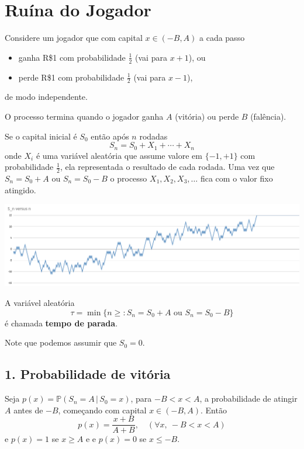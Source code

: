 \documentclass{article}
\begin{document}
\section*{Ruína do Jogador}

Considere um jogador que com capital \( x \in (-B, A) \) a cada passo 
\begin{itemize}
\item ganha R\$1 com probabilidade \( \tfrac{1}{2} \) (vai para \( x+1 \)), ou
\item perde R\$1 com probabilidade \( \tfrac{1}{2} \) (vai para \( x-1 \)),
\end{itemize}
de modo independente.  

O processo termina quando o jogador ganha $A$  (vitória) ou perde $B$ (falência).

Se o capital inicial é $S_0$ então após $n$ rodadas
$$
S_n =S_0 + X_1+\cdots+X_n
$$
onde $X_i$ é uma variável aleatória que assume valore em $\{-1,+1\}$
com probabilidade $\tfrac 12$, ela representada o resultado de cada
rodada. Uma vez que $S_n = S_0+A$ ou $S_n=S_0 -B$ o processo
$X_1,X_2,X_3,\dots$ fica com o valor fixo atingido.

\includegraphics[width=\textwidth]{srw.png}


A variável
aleatória
$$
\tau= \min\{n\geq \colon S_n = S_0+A \text{  ou } S_n=S_0 -B\}
$$
é chamada \textbf{tempo de parada}.

Note que podemos assumir que $S_0=0$.

\subsection*{1. Probabilidade de vitória}

Seja \( p(x) = \mathbb{P} (S_n = A \,|\, S_0=x)\), para $-B<x<A$, a
probabilidade de atingir \( A \) antes de \( -B \), começando com
capital \( x \in (-B,A) \). Então
\[
p(x) =
\displaystyle \frac{x + B}{A + B},  \quad (\forall x,~ -B < x < A)
\]
e $p(x) = 1$ se $x \geq A$  e 
e $p(x) = 0$ se $x \leq -B$.
\end{document}
